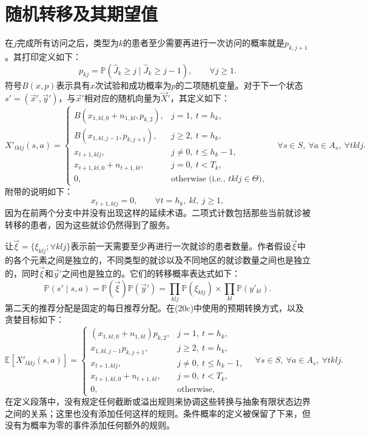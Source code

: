 \documentclass{article}
\begin{document}
\section*{随机转移及其期望值}
在$j$完成所有访问之后，类型为$k$的患者至少需要再进行一次访问的概率就是$p_{k,j+1}$。其打印定义如下：
\[
p_{kj}=\mathbb P(\hat J_k\geq j\mid\hat J_k\geq j-1),\qquad\forall j\geq1.
\]
符号$B(x,p)$表示具有$x$次试验和成功概率为$p$的二项随机变量。对于下一个状态$s'=(\vec x',\vec y')$，与$\vec x'$相对应的随机向量为$\vec X'$，其定义如下：
\begin{equation}
X'_{tklj}(s,a)=
\begin{cases}
B(x_{1,kl,0}+n_{1,kl},p_{k,2}),&j=1,\ t=h_k,\\
B(x_{1,kl,j-1},p_{k,j+1}),&j\geq2,\ t=h_k,\\
x_{t+1,klj},&j\neq0,\ t\leq h_k-1,\\
x_{t+1,kl,0}+n_{t+1,kl},&j=0,\ t<T_k,\\
0,&\text{otherwise (i.e., }tklj\in\Theta\text{)},
\end{cases}
\quad\forall s\in S,\ \forall a\in A_s,\ \forall tklj.
\tag{13}
\end{equation}
附带的说明如下：
\[
x_{t+1,klj}=0,\qquad\forall t=h_k,\ kl,\ j\geq1,
\]
因为在前两个分支中并没有出现这样的延续术语。二项式计数包括那些当前就诊被转移的患者，因为这些就诊仍然得到了服务。

让$\vec\xi=\{\xi_{klj};\forall klj\}$表示前一天需要至少再进行一次就诊的患者数量。作者假设$\vec\xi$中的各个元素之间是独立的，不同类型的就诊以及不同地区的就诊数量之间也是独立的，同时$\vec\xi$和$\vec y'$之间也是独立的。它们的转移概率表达式如下：
\[
\mathbb P(s'\mid s,a)
=\mathbb P(\vec\xi)\mathbb P(\vec y')
=\prod_{klj}\mathbb P(\xi_{klj})\times\prod_{kl}\mathbb P(y'_{kl}).
\]
第二天的推荐分配是固定的每日推荐分配。在(20c)中使用的预期转换方式，以及贪婪目标如下：
\begin{equation}
\mathbb E[X'_{tklj}(s,a)]=
\begin{cases}
(x_{1,kl,0}+n_{1,kl})p_{k,2},&j=1,\ t=h_k,\\
x_{1,kl,j-1}p_{k,j+1},&j\geq2,\ t=h_k,\\
x_{t+1,klj},&j\neq0,\ t\leq h_k-1,\\
x_{t+1,kl,0}+n_{t+1,kl},&j=0,\ t<T_k,\\
0,&\text{otherwise},
\end{cases}
\quad\forall s\in S,\ \forall a\in A_s,\ \forall tklj.
\tag{19}
\end{equation}
在定义段落中，没有规定任何截断或溢出规则来协调这些转换与抽象有限状态边界之间的关系；这里也没有添加任何这样的规则。条件概率的定义被保留了下来，但没有为概率为零的事件添加任何额外的规则。
\end{document}
